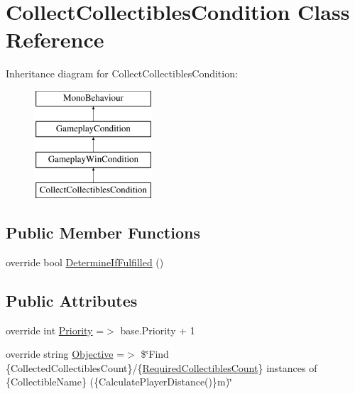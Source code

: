 \hypertarget{class_collect_collectibles_condition}{}\section{Collect\+Collectibles\+Condition Class Reference}
\label{class_collect_collectibles_condition}
Inheritance diagram for Collect\+Collectibles\+Condition\+:\begin{figure}[H]
\begin{center}
\leavevmode
\includegraphics[height=4.000000cm]{class_collect_collectibles_condition}
\end{center}
\end{figure}
\subsection*{Public Member Functions}
\begin{DoxyCompactItemize}
\item 
override bool \mbox{\hyperlink{class_collect_collectibles_condition_af61a1a03224942635451d7d63a886adf}{Determine\+If\+Fulfilled}} ()
\end{DoxyCompactItemize}
\subsection*{Public Attributes}
\begin{DoxyCompactItemize}
\item 
override int \mbox{\hyperlink{class_collect_collectibles_condition_ad0eb430669730c83f5185b0722ff6605}{Priority}} =$>$ base.\+Priority + 1
\item 
override string \mbox{\hyperlink{class_collect_collectibles_condition_a7713cb8f9cbaed01c0408a169dca4909}{Objective}} =$>$ \$\char`\"{}Find \{Collected\+Collectibles\+Count\}/\{\mbox{\hyperlink{class_collect_collectibles_condition_a3ef34344195a7d2014417ce976ef81b3}{Required\+Collectibles\+Count}}\} instances of \{Collectible\+Name\} (\{Calculate\+Player\+Distance()\}m)\char`\"{}
\end{DoxyCompactItemize}

